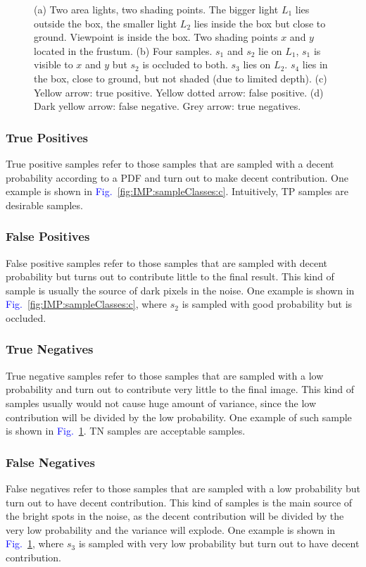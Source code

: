 \documentclass[]{book}
\renewcommand{\figurename}{\textcolor{blue}{Fig.\ }}
\begin{document}
\begin{figure}[!ht]
\begin{subfigure}{0.25\textwidth}
		\label{fig:IMP:sampleClasses:d}
	\end{subfigure}
	\caption[Classifying Samples]{(a) Two area lights, two shading points. The bigger light $L_1$ lies outside the box, the smaller light $L_2$ lies inside the box but close to ground. Viewpoint is inside the box. Two shading points $x$ and $y$ located in the frustum. (b) Four samples. $s_1$ and $s_2$ lie on $L_1$, $s_1$ is visible to $x$ and $y$ but $s_2$ is occluded to both. $s_3$ lies on $L_2$. $s_4$ lies in the box, close to ground, but not shaded (due to limited depth). (c) Yellow arrow: true positive. Yellow dotted arrow: false positive. (d) Dark yellow arrow: false negative. Grey arrow: true negatives.}
	\label{fig:IMP:sampleClasses}
\end{figure}

\subsubsection*{True Positives}
True positive samples refer to those samples that are sampled with a decent probability according to a PDF and turn out to make decent contribution.
One example is shown in \figurename \ref{fig:IMP:sampleClasses:c}.
Intuitively, TP samples are desirable samples.
\subsubsection*{False Positives}
False positive samples refer to those samples that are sampled with decent probability but turns out to contribute little to the final result.
This kind of sample is usually the source of dark pixels in the noise.
One example is shown in \figurename \ref{fig:IMP:sampleClasses:c}, where $s_2$ is sampled with good probability but is occluded.
\subsubsection*{True Negatives}
True negative samples refer to those samples that are sampled with a low probability and turn out to contribute very little to the final image.
This kind of samples usually would not cause huge amount of variance, since the low contribution will be divided by the low probability. 
One example of such sample is shown in \figurename \ref{fig:IMP:sampleClasses:d}.
TN samples are acceptable samples.
\subsubsection*{False Negatives}
False negatives refer to those samples that are sampled with a low probability but turn out to have decent contribution.
This kind of samples is the main source of the bright spots in the noise, as the decent contribution will be divided by the very low probability and the variance will explode.
One example is shown in \figurename \ref{fig:IMP:sampleClasses:d}, where $s_3$ is sampled with very low probability but turn out to have decent contribution.
\end{document}
